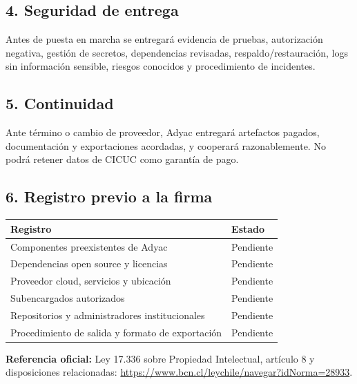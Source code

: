 \documentclass[
]{article}
\begin{document}
\hypertarget{4-seguridad-de-entrega}{%
\subsection{4. Seguridad de entrega}\label{4-seguridad-de-entrega}}

Antes de puesta en marcha se entregará evidencia de pruebas,
autorización negativa, gestión de secretos, dependencias revisadas,
respaldo/restauración, logs sin información sensible, riesgos conocidos
y procedimiento de incidentes.

\hypertarget{5-continuidad}{%
\subsection{5. Continuidad}\label{5-continuidad}}

Ante término o cambio de proveedor, Adyac entregará artefactos pagados,
documentación y exportaciones acordadas, y cooperará razonablemente. No
podrá retener datos de CICUC como garantía de pago.

\hypertarget{6-registro-previo-a-la-firma}{%
\subsection{6. Registro previo a la
firma}\label{6-registro-previo-a-la-firma}}

\begin{longtable}[]{@{}ll@{}}
\toprule\noalign{}
Registro & Estado \\
\midrule\noalign{}
\endhead
\bottomrule\noalign{}
\endlastfoot
Componentes preexistentes de Adyac & Pendiente \\
Dependencias open source y licencias & Pendiente \\
Proveedor cloud, servicios y ubicación & Pendiente \\
Subencargados autorizados & Pendiente \\
Repositorios y administradores institucionales & Pendiente \\
Procedimiento de salida y formato de exportación & Pendiente \\
\end{longtable}

\textbf{Referencia oficial:} Ley 17.336 sobre Propiedad Intelectual,
artículo 8 y disposiciones relacionadas:
\url{https://www.bcn.cl/leychile/navegar?idNorma=28933}.
\end{document}
